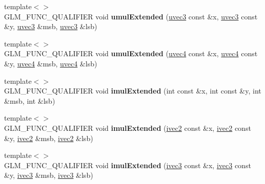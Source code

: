 \begin{DoxyCompactItemize}
\item 
{\footnotesize template$<$$>$ }\\G\+L\+M\+\_\+\+F\+U\+N\+C\+\_\+\+Q\+U\+A\+L\+I\+F\+I\+ER void {\bfseries umul\+Extended} (\hyperlink{group__core__types_gac4ba593917841b859ba1683b8b52b8fa}{uvec3} const \&x, \hyperlink{group__core__types_gac4ba593917841b859ba1683b8b52b8fa}{uvec3} const \&y, \hyperlink{group__core__types_gac4ba593917841b859ba1683b8b52b8fa}{uvec3} \&msb, \hyperlink{group__core__types_gac4ba593917841b859ba1683b8b52b8fa}{uvec3} \&lsb)\hypertarget{namespaceglm_a6e66bd04ac16ae0e3eb87e965b1609a9}{}\label{namespaceglm_a6e66bd04ac16ae0e3eb87e965b1609a9}

\item 
{\footnotesize template$<$$>$ }\\G\+L\+M\+\_\+\+F\+U\+N\+C\+\_\+\+Q\+U\+A\+L\+I\+F\+I\+ER void {\bfseries umul\+Extended} (\hyperlink{group__core__types_ga1c426d19627b32b14f0089f7f4ba7b1d}{uvec4} const \&x, \hyperlink{group__core__types_ga1c426d19627b32b14f0089f7f4ba7b1d}{uvec4} const \&y, \hyperlink{group__core__types_ga1c426d19627b32b14f0089f7f4ba7b1d}{uvec4} \&msb, \hyperlink{group__core__types_ga1c426d19627b32b14f0089f7f4ba7b1d}{uvec4} \&lsb)\hypertarget{namespaceglm_af466bd5c7fd7304b486b3f5985805349}{}\label{namespaceglm_af466bd5c7fd7304b486b3f5985805349}

\item 
{\footnotesize template$<$$>$ }\\G\+L\+M\+\_\+\+F\+U\+N\+C\+\_\+\+Q\+U\+A\+L\+I\+F\+I\+ER void {\bfseries imul\+Extended} (int const \&x, int const \&y, int \&msb, int \&lsb)\hypertarget{namespaceglm_a9472a4d6f9eec4abf4453a4be8365433}{}\label{namespaceglm_a9472a4d6f9eec4abf4453a4be8365433}

\item 
{\footnotesize template$<$$>$ }\\G\+L\+M\+\_\+\+F\+U\+N\+C\+\_\+\+Q\+U\+A\+L\+I\+F\+I\+ER void {\bfseries imul\+Extended} (\hyperlink{group__core__types_ga9e6ce9cfc7919976b318197e18d8a065}{ivec2} const \&x, \hyperlink{group__core__types_ga9e6ce9cfc7919976b318197e18d8a065}{ivec2} const \&y, \hyperlink{group__core__types_ga9e6ce9cfc7919976b318197e18d8a065}{ivec2} \&msb, \hyperlink{group__core__types_ga9e6ce9cfc7919976b318197e18d8a065}{ivec2} \&lsb)\hypertarget{namespaceglm_a9a2bbaf30c571f3851be2e0e60d856ca}{}\label{namespaceglm_a9a2bbaf30c571f3851be2e0e60d856ca}

\item 
{\footnotesize template$<$$>$ }\\G\+L\+M\+\_\+\+F\+U\+N\+C\+\_\+\+Q\+U\+A\+L\+I\+F\+I\+ER void {\bfseries imul\+Extended} (\hyperlink{group__core__types_ga6e12a4ca00d696f07da1df4eb73e0fe8}{ivec3} const \&x, \hyperlink{group__core__types_ga6e12a4ca00d696f07da1df4eb73e0fe8}{ivec3} const \&y, \hyperlink{group__core__types_ga6e12a4ca00d696f07da1df4eb73e0fe8}{ivec3} \&msb, \hyperlink{group__core__types_ga6e12a4ca00d696f07da1df4eb73e0fe8}{ivec3} \&lsb)\hypertarget{namespaceglm_ad7e696be671c1ff9cb6a7a3d2ef487f9}{}\label{namespaceglm_ad7e696be671c1ff9cb6a7a3d2ef487f9}


\end{DoxyCompactItemize}
